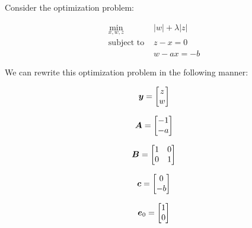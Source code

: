 \documentclass{article}
\begin{document}
Consider the optimization problem:

\begin{equation}
\begin{aligned}
\min_{x,w,z} & |w| + \lambda|z| \\
\text{subject to } & z - x = 0 \\
                   & w - ax = -b
\end{aligned}
\end{equation}

We can rewrite this optimization problem in the following manner:

\begin{equation}

\vy = \begin{bmatrix} z \\ w \end{bmatrix}

\end{equation}

\begin{equation}

\mA = \begin{bmatrix} -1 \\ -a \end{bmatrix}

\end{equation}

\begin{equation}

\mB = \begin{bmatrix} 1 & 0 \\ 0 & 1 \end{bmatrix}

\end{equation}

\begin{equation}

\vc = \begin{bmatrix} 0 \\ -b \end{bmatrix}

\end{equation}

\begin{equation}

\ve_0 = \begin{bmatrix} 1 \\ 0 \end{bmatrix}

\end{equation}
\end{document}
